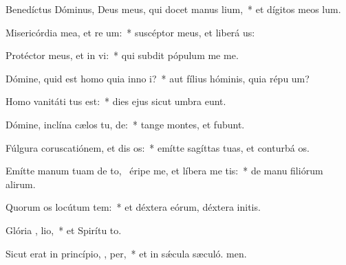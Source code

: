 \item Benedíctus Dóminus, Deus meus, qui docet manus   lium,~* et dígitos meos  lum.
\item Misericórdia mea, et re um:~* suscéptor meus, et liberá us:
\item Protéctor meus, et in  vi:~* qui subdit pópulum me  me.
\item Dómine, quid est homo quia inno i?~* aut fílius hóminis, quia répu um?
\item Homo vanitáti  tus est:~* dies ejus sicut umbra eunt.
\item Dómine, inclína cælos tu,  de:~* tange montes, et fubunt.
\item Fúlgura coruscatiónem, et dis os:~* emítte sagíttas tuas, et conturbá os.
\item Emítte manum tuam de to,~\pscross{} éripe me, et líbera me   tis:~* de manu filiórum alirum.
\item Quorum os locútum  tem:~* et déxtera eórum, déxtera initis.
\item Glória ,  lio,~* et Spirítu to.
\item Sicut erat in princípio,  ,  per,~* et in sǽcula sæculó. men.
